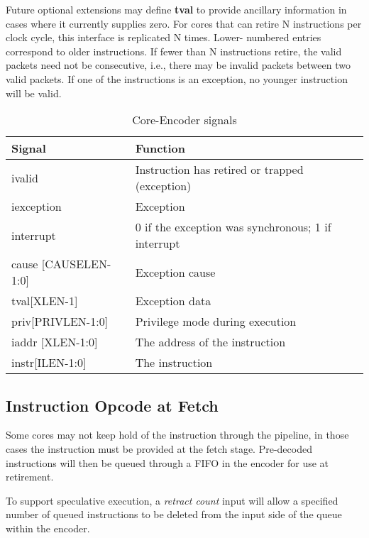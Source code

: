 Future optional extensions may define {\bf tval} to provide ancillary
information in cases where it currently supplies zero.  For cores that
can retire N instructions per clock cycle, this interface is
replicated N times.  Lower- numbered entries correspond to older
instructions.  If fewer than N instructions retire, the valid packets
need not be consecutive, i.e., there may be invalid packets between
two valid packets. If one of the instructions is an exception, no
younger instruction will be valid.

\begin{table}[htp]
    \centering
    \caption{Core-Encoder signals}
    \label{tab:ingress}
    \begin{tabulary}{\textwidth}{|l|l|}
        \hline
        {\bf Signal} & {\bf Function} \\
        \hline
        ivalid & Instruction has retired or trapped (exception) \\
        \hline
        iexception & Exception \\
        \hline
        interrupt & 0 if the exception was synchronous; 1 if interrupt \\
        \hline
        cause [CAUSELEN-1:0] & Exception cause \\
        \hline
        tval[XLEN-1]& Exception data \\
        \hline
        priv[PRIVLEN-1:0] & Privilege mode during execution \\
        \hline
        iaddr [XLEN-1:0] & The address of the instruction \\
        \hline
        instr[ILEN-1:0] & The instruction \\
        \hline
    \end{tabulary}
\end{table}

\subsection {Instruction Opcode at Fetch}

Some cores may not keep hold of the instruction through the pipeline,
in those cases the instruction must be provided at the fetch
stage. Pre-decoded instructions will then be queued through a FIFO in
the encoder for use at retirement.

To support speculative execution, a {\it retract count} input will allow a
specified number of queued instructions to be deleted from the input
side of the queue within the encoder.

